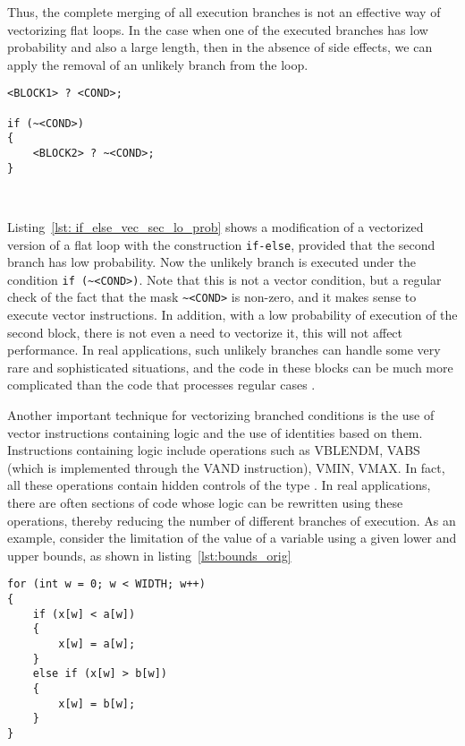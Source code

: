 \documentclass[
11pt,%
tightenlines,%
twoside,%
onecolumn,%
nofloats,%
nobibnotes,%
nofootinbib,%
superscriptaddress,%
noshowpacs,%
centertags]%
{revtex4}
\begin{document}
Thus, the complete merging of all execution branches is not an effective way of vectorizing flat loops.
In the case when one of the executed branches has low probability and also a large length, then in the absence of side effects, we can apply the removal of an unlikely branch from the loop.

\begin{lstlisting}[caption={Vectorization of \texttt{if-else} with unlikely branch.},label={lst:if_else_vec_sec_lo_prob}]
<BLOCK1> ? <COND>;

if (~<COND>)
{
    <BLOCK2> ? ~<COND>;
}
\end{lstlisting}

\

Listing~\ref{lst: if_else_vec_sec_lo_prob} shows a modification of a vectorized version of a flat loop with the construction \texttt{if-else}, provided that the second branch has low probability.
Now the unlikely branch is executed under the condition \texttt{if (\~{}<COND>)}.
Note that this is not a vector condition, but a regular check of the fact that the mask \texttt{\~{}<COND>} is non-zero, and it makes sense to execute vector instructions.
In addition, with a low probability of execution of the second block, there is not even a need to vectorize it, this will not affect performance.
In real applications, such unlikely branches can handle some very rare and sophisticated situations, and the code in these blocks can be much more complicated than the code that processes regular cases \cite{Rybakov_Aircraft}.

Another important technique for vectorizing branched conditions is the use of vector instructions containing logic and the use of identities based on them.
Instructions containing logic include operations such as VBLENDM, VABS (which is implemented through the VAND instruction), VMIN, VMAX.
In fact, all these operations contain hidden controls of the type .
In real applications, there are often sections of code whose logic can be rewritten using these operations, thereby reducing the number of different branches of execution.
As an example, consider the limitation of the value of a variable using a given lower and upper bounds, as shown in listing~\ref{lst:bounds_orig}

\begin{lstlisting}[caption={Limiting the value using the lower and upper bounds.},label={lst:bounds_orig}]
for (int w = 0; w < WIDTH; w++)
{
    if (x[w] < a[w])
    {
        x[w] = a[w];
    }
    else if (x[w] > b[w])
    {
        x[w] = b[w];
    }
}
\end{lstlisting}
\end{document}
